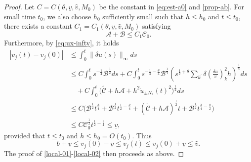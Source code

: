 \documentclass[10pt,a4paper]{amsart}
\begin{document}
\begin{proof}
Let \(C=C(\theta,\underline{v},\hat v,M_0)\) be the constant in \eqref{eq:est-a0}  and \eqref{prop-ab}. For small time $t_0$, we also choose \(h_{0}\) sufficiently small such that \(h\leq h_{0}\) and \(t\leq t_0\), there exists a constant $C_1=C_1(\theta,\underline{v},\hat v,M_0)$ satisfying
\[\mathscr{A}+\mathscr{B}\leq C_1\mathscr{C}_0.\]
Furthermore, by \eqref{eq:ux-infty}, it holds
\begin{equation}\label{eq:v-infty}
	\begin{aligned}
\left| {{v}_{j}\left( {t}\right)  - {v}_{j}\left( 0\right) }\right|  &\leq  \int_{0}^{{t}}\parallel {\delta u}\left( s\right) {\parallel }_{\infty }{ds}\\
&\leq  C\int_{0}^{t}  {s}^{-\frac{1}{4}}{\mathscr{B}}^{\frac{1}{2}}ds+C\int_{0}^{t}  {{s}^{-\frac{1}{4} - \frac{\theta }{4}}{\mathscr{B}}^{\frac{1}{4}}{\left( {s}^{\frac{1}{2} + \theta }\mathop{\sum }\limits_{k^{\prime}}\delta {\left( \frac{\delta u}{v}\right) }_{k}^{2}h\right) }^{\frac{1}{4}}}ds\\
&\quad +C\int_{0}^{t}\big(\tilde{\mathscr{C}}+ h\mathscr{A}+h^{2}\dot{u}_{\pm N_* }(t)^{2}\big)^{\frac12}ds\\
&\leq  C\Big({\mathscr{B}}^{\frac{1}{2}}{t}^{\frac{3}{4}}+  {\mathscr{B}}^{\frac{1}{2}}{t}^{\frac{1}{2} - \frac{\theta }{4}} + (\tilde{\mathscr{C}}+ h\mathscr{A})^{\frac{1}{2}}t+ {\mathscr{B}}^{\frac{1}{2}}{t}^{\frac{3}{4} - \frac{\theta }{2}} \Big)\\
&\leq  C{\mathscr{C}}_{0}^{\frac{1}{2}}t^{\frac{1}{2} - \frac{\theta }{4}}\leq \underline{v},
	\end{aligned}	
\end{equation}
provided that \(t\leq t_0\) and \(h\leq h_{0}=O(t_0)\). Thus
\begin{equation}\label{eq:v-infty1}
	b+\underline{v}\leq v_j(0)-\underline{v}\leq v_j(t)\leq v_j(0)+\underline{v}\leq \hat{v}.
\end{equation}
The proof of \eqref{local-01}-\eqref{local-02} then proceeds as above.


\end{proof}
\end{document}

